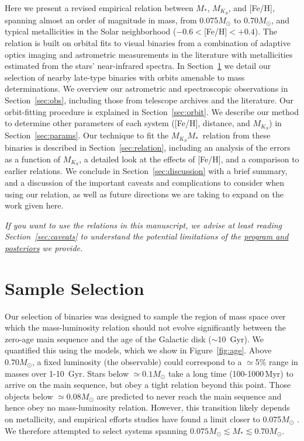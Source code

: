 \documentclass[twocolumn]{aastex62}
\newcommand{\mks}{$M_{K_S}$}
\newcommand{\mmk}{$M_{K_S}$\textendash$M_*$}
\begin{document}
Here we present a revised empirical relation between $M_*$, $M_{K_S}$, and [Fe/H], spanning almost an order of magnitude in mass, from 0.075$M_\odot$ to 0.70$M_\odot$, and typical metallicities in the Solar neighborhood ($-0.6<$[Fe/H]$<+0.4$). The relation is built on orbital fits to visual binaries from a combination of adaptive optics imaging and astrometric measurements in the literature with metallicities estimated from the stars' near-infrared spectra. In Section~\ref{sec:targets} we detail our selection of nearby late-type binaries with orbits amenable to mass determinations. We overview our astrometric and spectroscopic observations in Section~\ref{sec:obs}, including those from telescope archives and the literature. Our orbit-fitting procedure is explained in Section~\ref{sec:orbit}. We describe our method to determine other parameters of each system ([Fe/H], distance, and \mks) in Section~\ref{sec:params}. Our technique to fit the \mmk\ relation from these binaries is described in Section~\ref{sec:relation}, including an analysis of the errors as a function of \mks, a detailed look at the effects of [Fe/H], and a comparison to earlier relations. We conclude in Section~\ref{sec:discussion} with a brief summary, and a discussion of the important caveats and complications to consider when using our relation, as well as future directions we are taking to expand on the work given here.

 {\it If you want to use the relations in this manuscript, we advise at least reading Section~\ref{sec:caveats} to understand the potential limitations of the \href{https://github.com/awmann/M_-M_K-}{program and posteriors} we provide.}


\section{Sample Selection}\label{sec:targets}
Our selection of binaries was designed to sample the region of mass space over which the mass-luminosity relation should not evolve significantly between the zero-age main sequence and the age of the Galactic disk ($\sim$10~Gyr). We quantified this using the \citet{BHAC15} models, which we show in Figure~\ref{fig:age}. Above $0.70M_\odot$, a fixed luminosity (the observable) could correspond to a $\simeq$5\% range in masses over 1-10\, Gyr. Stars below $\simeq0.1M_\odot$ take a long time (100-1000\,Myr) to arrive on the main sequence, but obey a tight relation beyond this point. Those objects below $\simeq0.08M_\odot$ are predicted to never reach the main sequence and hence obey no mass-luminosity relation. However, this transition likely depends on metallicity, and empirical efforts studies have found a limit closer to 0.075$M_\odot$ \citep[e.g.,][]{Dieterich2014,Dupuy2017}. We therefore attempted to select systems spanning $0.075M_\odot \lesssim M_* \lesssim0.70M_\odot$.
\end{document}

